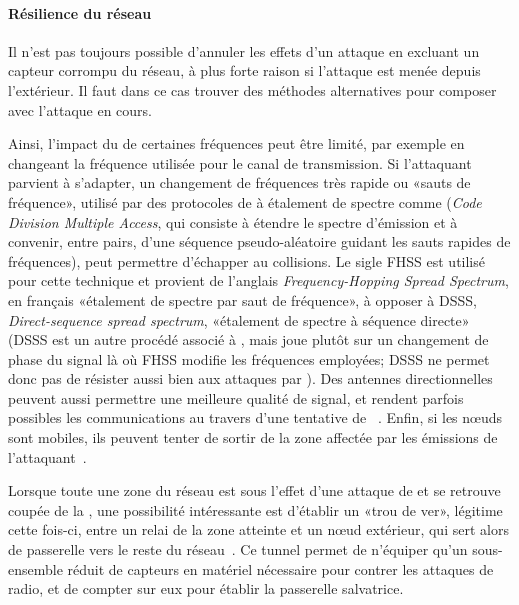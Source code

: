 \paragraph{Résilience du réseau}
Il n'est pas toujours possible d'annuler les effets d'un attaque en excluant un capteur corrompu du réseau, à plus forte raison si l'attaque est menée depuis l'extérieur.
Il faut dans ce cas trouver des méthodes alternatives pour composer avec l'attaque en cours.

Ainsi, l'impact du  de certaines fréquences peut être limité, par exemple en changeant la fréquence utilisée pour le canal de transmission.
Si l'attaquant parvient à s'adapter, un changement de fréquences très rapide ou «sauts de fréquence», utilisé par des protocoles de  à étalement de spectre comme \cdma (\textit{Code Division Multiple Access}, qui consiste à étendre le spectre d'émission et à convenir, entre pairs, d'une séquence pseudo-aléatoire guidant les sauts rapides de fréquences), peut permettre d'échapper au collisions.
Le sigle FHSS est utilisé pour cette technique et provient de l'anglais \textit{Frequency-Hopping Spread Spectrum}, en français «étalement de spectre par saut de fréquence», à opposer à DSSS, \textit{Direct-sequence spread spectrum}, \cad «étalement de spectre à séquence directe» (DSSS est un autre procédé associé à \cdma, mais joue plutôt sur un changement de phase du signal là où FHSS modifie les fréquences employées; DSSS ne permet donc pas de résister aussi bien aux attaques par ).
Des antennes directionnelles peuvent aussi permettre une meilleure qualité de signal, et rendent parfois possibles les communications au travers d'une tentative de ~\cite{PI11}.
Enfin, si les nœuds sont mobiles, ils peuvent tenter de sortir de la zone affectée par les émissions de l'attaquant~\cite{PI11}.

Lorsque toute une zone du réseau est sous l'effet d'une attaque de  et se retrouve coupée de la \sdb, une possibilité intéressante est d'établir un «trou de ver», légitime cette fois-ci, entre un relai de la zone atteinte et un nœud extérieur, qui sert alors de passerelle vers le reste du réseau~\cite{CCH07}.
Ce tunnel permet de n'équiper qu'un sous-ensemble réduit de capteurs en matériel nécessaire pour contrer les attaques de  radio, et de compter sur eux pour établir la passerelle salvatrice.

